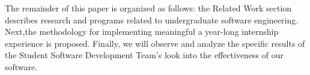 The remainder of this paper is organized as follows: the Related Work section describes research and programs related to undergraduate software engineering. Next,the methodology for implementing meaningful a year-long internship experience is proposed. Finally, we will observe and analyze the specific results of the Student Software Development Team's look into the effectiveness of our software.

